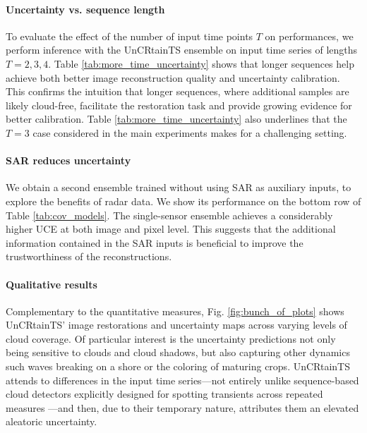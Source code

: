 \documentclass[10pt,twocolumn,letterpaper]{article}
\newcommand{\figref}[1]{ Fig. \ref{#1}}
\newcommand{\tabref}[1]{ Table \ref{#1}}
\begin{document}
\paragraph{\bf Uncertainty vs. sequence length} To evaluate the effect of the number of input time points $T$ on performances, we perform inference with the UnCRtainTS ensemble on input time series of lengths $T=2,3,4$.
\tabref{tab:more_time_uncertainty} shows that longer sequences help achieve both better image reconstruction quality and uncertainty calibration. 
This confirms the intuition that longer sequences, where additional samples are likely cloud-free, facilitate the restoration task and provide growing evidence for better calibration.  \tabref{tab:more_time_uncertainty} also underlines that the $T=3$ case considered in the main experiments makes for a challenging setting.


\paragraph{\bf SAR reduces uncertainty} We obtain a second ensemble trained without using SAR as auxiliary inputs, to explore the benefits of radar data. We show its performance on the bottom row of \tabref{tab:cov_models}. The single-sensor ensemble achieves a considerably higher UCE at both image and pixel level. This suggests that the additional information contained in the SAR inputs is beneficial to improve the trustworthiness of the reconstructions. 




\paragraph{\bf Qualitative results} Complementary to the quantitative measures, \figref{fig:bunch_of_plots} shows UnCRtainTS' image restorations and uncertainty maps across varying levels of cloud coverage. Of particular interest is the uncertainty predictions not only being sensitive to clouds and cloud shadows, but also capturing other dynamics such waves breaking on a shore or the coloring of maturing crops. UnCRtainTS attends to differences in the input time series---not entirely unlike sequence-based cloud detectors explicitly designed for spotting transients across repeated measures \cite{MAJA}---and then, due to their temporary nature, attributes them an elevated aleatoric uncertainty.
\end{document}
